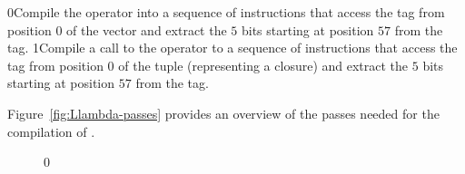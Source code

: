 \documentclass[7x10]{TimesAPriori_MIT}%
\def\racketEd{0}
\def\pythonEd{1}
\def\edition{1}
\newcommand{\racket}[1]{{\if\edition\racketEd{#1}\fi}}
\newcommand{\pythonColor}[0]{}
\newcommand{\python}[1]{{\if\edition\pythonEd\pythonColor #1\fi}}
\numberwithin{theorem}{chapter}
\numberwithin{definition}{chapter}
\numberwithin{equation}{chapter}
\begin{document}
\racket{Compile the  operator into a sequence of
instructions that access the tag from position $0$ of the vector and
extract the $5$ bits starting at position $57$ from the tag.}
%
\python{Compile a call to the  operator to a sequence of
instructions that access the tag from position $0$ of the tuple
(representing a closure) and extract the $5$ bits starting at position
$57$ from the tag.}

Figure~\ref{fig:Llambda-passes} provides an overview of the passes
needed for the compilation of \LangLam{}.

\begin{figure}[bthp]
  \begin{tcolorbox}[colback=white]
{\if\edition\racketEd    
{}}
\end{tcolorbox}
\end{figure}
\end{document}
